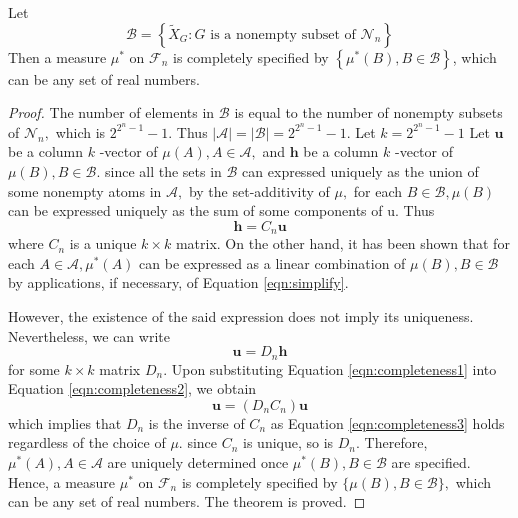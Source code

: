 \begin{theorem}
Let
\begin{equation}
    \mathcal{B} = \left\{ \tilde{X}_{G}: G \text{ is a nonempty subset of  }\mathcal{N}_n \right\}
\end{equation}
Then a measure $\mu^{*}$ on $\mathcal{F}_n$ is completely specified by $\left\{ \mu^{*}(B), B \in \mathcal{B} \right\}$, which can be any set of real numbers.

\begin{proof}
The number of elements in $\mathcal{B}$ is equal to the number of nonempty subsets of $\mathcal{N}_{n},$ which is $2^{2^{n}-1}-1 .$ Thus $|\mathcal{A}|=|\mathcal{B}|=2^{2^{n}-1}-1  .$ Let $k=2^{2^{n}-1}-1 $ Let $\mathbf{u}$ be a column $k$ -vector of $\mu(A), A \in \mathcal{A},$ and $\mathbf{h}$ be a column $k$ -vector of $\mu(B), B \in \mathcal{B} .$ since all the sets in $\mathcal{B}$ can expressed uniquely as the union of some nonempty atoms in $\mathcal{A},$ by the set-additivity of $\mu,$ for each $B \in \mathcal{B}, \mu(B)$ can be expressed uniquely as the sum of some components of u. Thus
\begin{equation}
\mathbf{h}=C_{n} \mathbf{u}
\label{eqn:completeness1}
\end{equation}
where $C_{n}$ is a unique $k \times k$ matrix. On the other hand, it has been shown that for each $A \in \mathcal{A}, \mu^{*}(A)$ can be expressed as a linear combination of $\mu(B), B \in \mathcal{B}$ by applications, if necessary, of Equation \ref{eqn:simplify}.

However, the existence of the said expression does not imply its uniqueness. Nevertheless, we can write
\begin{equation}
\mathbf{u}=D_{n} \mathbf{h}
\label{eqn:completeness2}
\end{equation}
for some $k \times k$ matrix $D_{n} .$ Upon substituting Equation \ref{eqn:completeness1} into Equation \ref{eqn:completeness2}, we obtain
\begin{equation}
\mathbf{u}=\left(D_{n} C_{n}\right) \mathbf{u}
\label{eqn:completeness3}
\end{equation}
which implies that $D_{n}$ is the inverse of $C_{n}$ as Equation \ref{eqn:completeness3} holds regardless of the choice of $\mu .$ since $C_{n}$ is unique, so is $D_{n} .$ Therefore, $\mu^{*}(A), A \in \mathcal{A}$ are uniquely determined once $\mu^{*}(B), B \in \mathcal{B}$ are specified. Hence, a measure $\mu^{*}$ on $\mathcal{F}_{n}$ is completely specified by $\{\mu(B), B \in \mathcal{B}\},$ which can be any set of real numbers. The theorem is proved.

\end{proof}

\end{theorem}